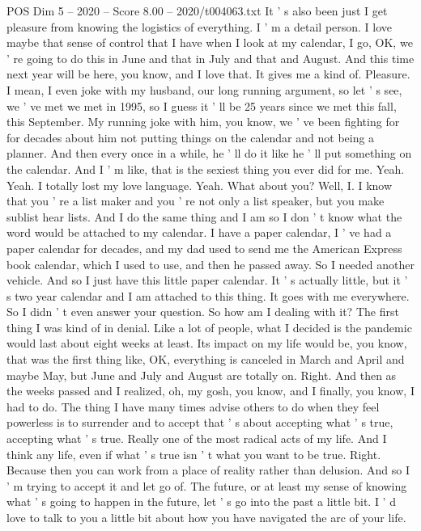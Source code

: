 \begin{textsample}{POS Dim 5 – 2020 – Score 8.00 – 2020/t004063.txt}
It ' s also been just I get pleasure from knowing the logistics of everything.
I ' m a detail person.
I love maybe that sense of control that I have when I look at my calendar, I go, OK, we ' re going to do this in June and that in July and that and August.
And this time next year will be here, you know, and I love that.
It gives me a kind of.
Pleasure.
I mean, I even joke with my husband, our long running argument, so let ' s see, we ' ve met we met in 1995, so I guess it ' ll be 25 years since we met this fall, this September.
My running joke with him, you know, we ' ve been fighting for for decades about him not putting things on the calendar and not being a planner.
And then every once in a while, he ' ll do it like he ' ll put something on the calendar.
And I ' m like, that is the sexiest thing you ever did for me.
Yeah.
Yeah.
I totally lost my love language.
Yeah.
What about you?
Well, I.
I know that you ' re a list maker and you ' re not only a list speaker, but you make sublist hear lists.
And I do the same thing and I am so I don ' t know what the word would be attached to my calendar.
I have a paper calendar, I ' ve had a paper calendar for decades, and my dad used to send me the American Express book calendar, which I used to use, and then he passed away.
So I needed another vehicle.
And so I just have this little paper calendar.
It ' s actually little, but it ' s two year calendar and I am attached to this thing.
It goes with me everywhere.
So I didn ' t even answer your question.
So how am I dealing with it?
The first thing I was kind of in denial.
Like a lot of people, what I decided is the pandemic would last about eight weeks at least.
Its impact on my life would be, you know, that was the first thing like, OK, everything is canceled in March and April and maybe May, but June and July and August are totally on.
Right.
And then as the weeks passed and I realized, oh, my gosh, you know, and I finally, you know, I had to do.
The thing I have many times advise others to do when they feel powerless is to surrender and to accept that ' s about accepting what ' s true, accepting what ' s true.
Really one of the most radical acts of my life.
And I think any life, even if what ' s true isn ' t what you want to be true.
Right.
Because then you can work from a place of reality rather than delusion.
And so I ' m trying to accept it and let go of.
The future, or at least my sense of knowing what ' s going to happen in the future, let ' s go into the past a little bit.
I ' d love to talk to you a little bit about how you have navigated the arc of your life.

\end{textsample}
